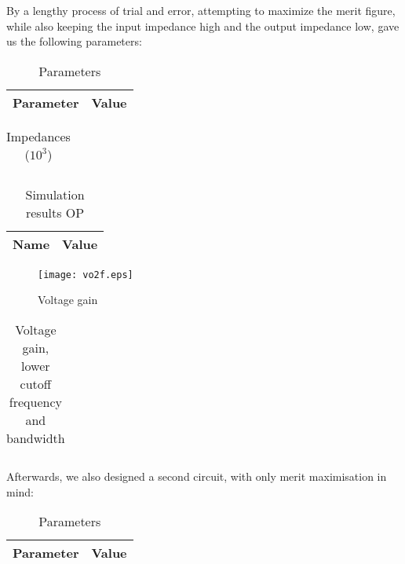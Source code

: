 By a lengthy process of trial and error, attempting to maximize the merit figure, while also keeping the input impedance high and the output impedance low, gave us the following parameters:

\begin{table}[H]
        \centering
        \begin{tabular}{|c|c|}
        \hline
        Parameter & Value \\
        \hline
        
        \hline
        \end{tabular}
        \caption{Parameters}
        \label{param}
\end{table}

\begin{table}[H]
  \centering
  \begin{tabular}{|c|c|}
    \hline
        
        \hline
  \end{tabular}
  \caption{Impedances ($10^3$)}
  \label{tab:sim_imp}
\end{table}

\begin{table}[H]
  \centering
  \begin{tabular}{|c|c|}
    \hline
        {\bf Name} & {\bf Value} \\
        \hline
        \hline
        
        \hline
  \end{tabular}
  \caption{Simulation results OP}
\end{table}

\begin{figure}[H]
\centering
\texttt{[image: vo2f.eps]}
\caption{Voltage gain}
\label{vg}
\end{figure}

\begin{table}[H]
  \centering
  \begin{tabular}{|c|c|}
    \hline
        
        \hline
  \end{tabular}
  \caption{Voltage gain, lower cutoff frequency and bandwidth}
  \label{tab:res_sim}
\end{table}

Afterwards, we also designed a second circuit, with only merit maximisation in mind:

\begin{table}[H]
        \centering
        \begin{tabular}{|c|c|}
        \hline
        Parameter & Value \\
        \hline
        
        \hline
        \end{tabular}
        \caption{Parameters}
        \label{param_mb}
\end{table}

